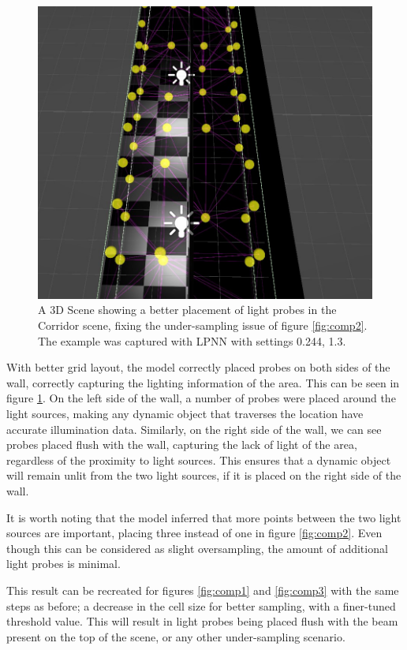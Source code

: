 \begin{figure}[h]
	\centering
	\includegraphics[scale=0.5]{Graphics/results/corridor_0.244_1.3.jpg}
	\caption{A 3D Scene showing a better placement of light probes in the Corridor scene, fixing the under-sampling issue of figure \ref{fig:comp2}. The example was captured with LPNN with settings 0.244, 1.3.}
	\label{fig:corr_1}
\end{figure}

With better grid layout, the model correctly placed probes on both sides of the wall, correctly capturing the lighting information of the area. This can be seen in figure \ref{fig:corr_1}. On the left side of the wall, a number of probes were placed around the light sources, making any dynamic object that traverses the location have accurate illumination data. Similarly, on the right side of the wall, we can see probes placed flush with the wall, capturing the lack of light of the area, regardless of the proximity to light sources. This ensures that a dynamic object will remain unlit from the two light sources, if it is placed on the right side of the wall. 

It is worth noting that the model inferred that more points between the two light sources are important, placing three instead of one in figure \ref{fig:comp2}. Even though this can be considered as slight oversampling, the amount of additional light probes is minimal.

This result can be recreated for figures \ref{fig:comp1} and \ref{fig:comp3} with the same steps as before; a decrease in the cell size for better sampling, with a finer-tuned threshold value. This will result in light probes being placed flush with the beam present on the top of the scene, or any other under-sampling scenario.

